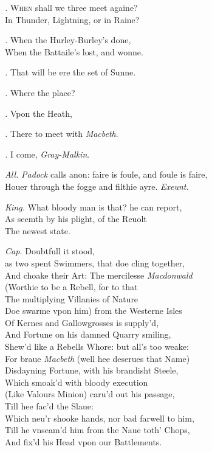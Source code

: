 \documentclass[12pt]{sides}
\newcommand{\dia}[1]{\hskip 15pt\textit{#1}\hskip 6pt}
\begin{document}
	\begin{multicols}{2}		
			
			\dia{.} \lettrine{W}{hen} shall we three meet againe? \\ In Thunder, Lightning, or in Raine?
			
			\dia{.} When the Hurley-Burley's done, \\ When the Battaile's lost, and wonne.
			
			\dia{.} That will be ere the set of Sunne.
			
			\dia{.} Where the place?
			
			\dia{.} Vpon the Heath,
			
			\dia{.} There to meet with \textit{Macbeth}.
			
			\dia{.} I come, \textit{Gray-Malkin}.
			
			\dia{All.} \textit{Padock} calls anon: faire is foule, and foule is faire, \\ Houer through the fogge and filthie ayre. \hfill \textit{Exeunt.}
            
   
			
			\dia{King.} What bloody man is that? he can report, \\  As seemth by his plight, of the Reuolt \\ The newest state.
			
			\dia{Cap.} Doubtfull it stood,\\ as two spent Swimmers, that doe cling together,\\ And choake their Art: The mercilesse \textit{Macdonwald} \\ (Worthie to be a Rebell, for to that \\ The multiplying Villanies of Nature \\ Doe swarme vpon him) from the Westerne Isles \\ Of Kernes and Gallowgrosses is supply'd, \\ And Fortune on his damned Quarry smiling, \\ Shew'd like a Rebells Whore: but all's too weake: \\ For braue \textit{Macbeth} (well hee deserues that Name) \\ Disdayning Fortune, with his brandisht Steele, \\ Which smoak'd with bloody execution \\ (Like Valours Minion) caru'd out his passage, \\ Till hee fac'd the Slaue: \\ Which neu'r shooke hands, nor bad farwell to him, \\ Till he vnseam'd him from the Naue toth' Chops, \\ And fix'd his Head vpon our Battlements.
			

\end{multicols}
\end{document}
